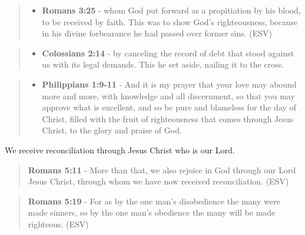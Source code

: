 \documentclass[11pt]{article}
\begin{document}
\begin{quote}
\begin{itemize}
\item \textbf{Romans 3:25} -  whom God put forward as a propitiation by his blood, to be received by faith.  This was to show God's righteousness, because in his divine forbearance he had passed over former sins.  (ESV)
\end{itemize}
\end{quote}

\begin{quote}
\begin{itemize}
\item \textbf{Colossians 2:14} - by canceling the record of debt that stood against us with its legal demands. This he set aside, nailing it to the cross.
\end{itemize}
\end{quote}

\begin{quote}
\begin{itemize}
\item \textbf{Philippians 1:9-11} - And it is my prayer that your love may abound more and more, with knowledge and all discernment, so that you may approve what is excellent, and so be pure and blameless for the day of Christ, filled with the fruit of righteousness that comes through Jesus Christ, to the glory and praise of God.
\end{itemize}
\end{quote}

We receive reconciliation through Jesus Christ who is our Lord.

\begin{quote}
\textbf{Romans 5:11} - More than that, we also rejoice in God through our Lord Jesus Christ, through whom we have now received reconciliation. (ESV)
\end{quote}

\begin{quote}
\textbf{Romans 5:19} - For as by the one man's disobedience the many were made sinners, so by the one man's obedience the many will be made righteous. (ESV)
\end{quote}
\end{document}
